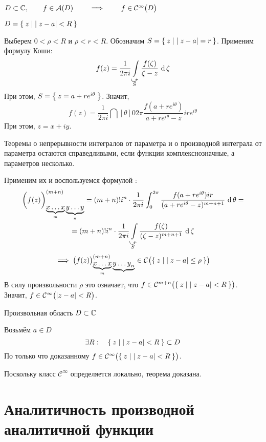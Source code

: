 \begin{theorem}
	$ D \sub \Co, \qquad f \in \mathcal A (D) \qquad \implies \qquad f \in \Cont[\infty] D $
\end{theorem}

\begin{eproof}
	\item $ D = \set{z \mid |z - a| < R} $

	Выберем $ 0 < \rho < R $ и $ \rho < r < R $. Обозначим $ S = \set{z \mid |z - a| = r} $. Применим формулу Коши:
	$$ f(z) = \frac1{2\pi i} \cint[\zeta]{\curvedir S}{\frac{f(\zeta)}{\zeta - z}} $$
	При этом, $ S = \set{z = a + re^{i\theta}} $. Значит,
	$$ f(z) = \frac1{2\pi i} \dint[\theta]0{2\pi}{\frac{f(a + re^{i\theta})}{{a + re^{i\theta} - z}}ire^{i\theta}} $$
	При этом, $ z = x + iy $.
	\begin{statement}
		Теоремы о непрерывности интегралов от параметра и о производной интеграла от параметра остаются справедливыми, если функции комплекснозначные, а параметров несколько.
	\end{statement}
	Применим их и воспользуемся формулой :
	\begin{multline*}
		\bigg( f(z) \bigg)_{\underbrace{x \dots x}_m \underbrace{y \dots y}_n}^{(m + n)} = (m + n)!i^n \cdot \frac1{2\pi i} \dint[\theta]0{2\pi}{\frac{f(a + re^{i\theta})ir}{(a + re^{i\theta} - z)^{m + n + 1}}} = \\
		= (m + n)!i^n \cdot \frac1{2\pi i} \cint[\zeta]{\curvedir S}{\frac{f(\zeta)}{(\zeta - z)^{m + n + 1}}}
	\end{multline*}
	$$ \implies \big( f(z) \big)_{\underbrace{x \dots x}_m \underbrace{{y \dots y}_n}}^{(m + n)} \in \Cont{ \set{z \mid |z - a| \le \rho }} $$
	В силу произвольности $ \rho $ это означает, что $ f \in \Cont[m + n]{\set{z \mid |z - a| < R}} $. \\
	Значит, $ f \in \Cont[\infty]{|z - a| < R} $.

	\item Произвольная область $ D \sub \Co $

	Возьмём $ a \in D $
	$$ \exists R : \quad \set{z \mid |z - a| < R} \sub D $$
	По только что доказанному $ f \in \Cont[\infty]{\set{ z \mid |z - a| < R}} $.

	Поскольку класс $ \mathcal C^\infty $ определяется локально, теорема доказана.
\end{eproof}

\section{Аналитичность производной аналитичной функции}

